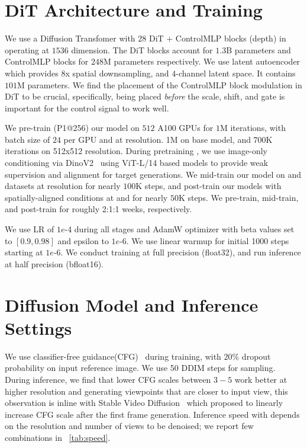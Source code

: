 
\section{DiT Architecture and Training}\label{app_sec:dit}

 We use a Diffusion Transfomer with $28$ DiT + ControlMLP blocks (depth) in \ourmodel operating at $1536$ dimension. The DiT blocks account for $1.3$B parameters and ControlMLP blocks for $248$M parameters respectively. We use 
latent autoencoder which provides $8$x spatial downsampling, and $4$-channel latent space. 
It contains $101$M parameters. We find the placement of the ControlMLP block modulation in DiT to be crucial, specifically, being placed \textit{before} the scale, shift, and gate is important for the control signal to work well. 

 We pre-train (P1@256) our model on $512$ A100 GPUs for $1$M iterations, with batch size of $24$ per GPU and at \restwo resolution. 1M on base model, and 700K iterations on 512x512 resolution. During pretraining \ourmodel, we use image-only conditioning via 
DinoV2~\cite{oquab2023dinov2} using ViT-L/14 based models to provide weak supervision and alignment for target generations. We mid-train our model on \fullbody and \upperbody datasets at \resone resolution for nearly $100$K steps, and post-train our models with spatially-aligned conditions at \resthree and \resfour for nearly $50$K steps. We pre-train, mid-train, and post-train for roughly 2:1:1 weeks, respectively.

 We use LR of $1e$-4 during all stages and AdamW optimizer with beta values set to $[0.9, 0.98]$ and epsilon to $1e$-6. We use linear warmup for initial 1000 steps starting at $1e$-6. We conduct training at full precision (float32), and run inference at half precision (bfloat16). 



\section{Diffusion Model and Inference Settings}
\label{app_sec:diffusion}



We use classifier-free guidance(CFG)~\cite{ho2022classifierfree} during training, with $20$\% dropout probability on input reference image. We use 50 DDIM steps for sampling. During inference, we find that lower CFG scales between $3-5$ work better at higher resolution and generating viewpoints that are closer to input view, this observation is inline with Stable Video Diffusion~\cite{blattmann2023stable} which proposed to linearly increase CFG scale after the first frame generation. Inference speed with \ourmodel depends on the resolution and number of views to be denoised; we report few combinations in ~\cref{tab:speed}.

